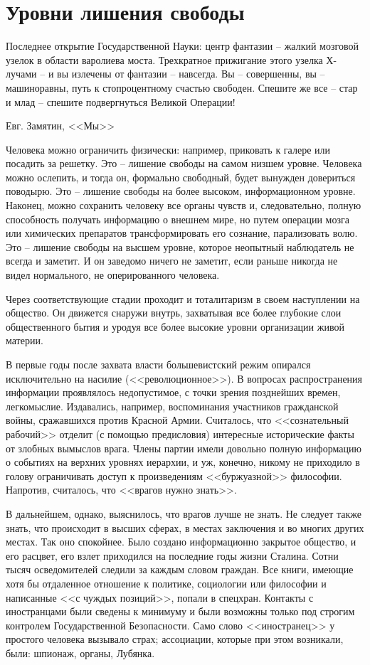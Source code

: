 \documentclass{book}
\begin{document}
\newpage
\section{Уровни лишения свободы}
\epigraph{Последнее открытие Государственной Науки: 
центр фантазии -- жалкий мозговой узелок в области варолиева моста. Трехкратное прижигание этого узелка Х-лучами -- и вы 
излечены от фантазии -- навсегда. 
Вы -- совершенны, вы -- машиноравны, путь к стопроцентному счастью свободен. Спешите же все -- стар и млад -- спешите 
подвергнуться Великой Операции!}{Евг. Замятин, <<Мы>>}

Человека можно ограничить физически: например, приковать к галере или посадить за решетку. Это -- лишение свободы на самом 
низшем уровне. Человека можно ослепить, и тогда он, формально свободный, будет вынужден довериться поводырю. Это -- лишение 
свободы на более высоком, информационном уровне. Наконец, можно сохранить человеку все органы чувств и, следовательно, полную 
способность получать информацию о внешнем мире, но путем операции мозга или химических препаратов трансформировать его сознание, 
парализовать волю. Это -- лишение свободы на высшем уровне, которое неопытный наблюдатель не всегда и заметит. И он заведомо 
ничего не заметит, если раньше никогда не видел нормального, не оперированного человека.

Через соответствующие стадии проходит и тоталитаризм в своем наступлении на общество. Он движется снаружи внутрь, захватывая все 
более глубокие слои общественного бытия и уродуя все более высокие уровни организации живой материи.

В первые годы после захвата власти большевистский ре­жим опирался исключительно на насилие (<<революционное>>). В вопросах распространения информации проявлялось недо­пустимое, с точки зрения позднейших времен, легкомыслие. Издавались, например, воспоминания участников гражданской войны, сражавшихся против Красной Армии. Считалось, что <<сознательный рабочий>> отделит (с помощью предисловия) интересные исторические факты от злобных вымыслов врага. Члены партии имели довольно полную информацию о событиях на верхних уровнях иерархии, и уж, конечно, никому не приходило в голову ограничивать доступ к произведениям <<буржуазной>> философии. Напротив, считалось, что <<врагов нужно знать>>.

В дальнейшем, однако, выяснилось, что врагов лучше не знать. Не следует также знать, что происходит в высших сферах, в местах заключения и во многих других местах. Так оно спокойнее. Было создано информационно закрытое общество, и его расцвет, его взлет приходился на последние годы жизни Сталина. Сотни тысяч осведомителей следили за каждым словом граждан. Все книги, имеющие хотя бы отдаленное отношение к политике, социологии или философии и написанные <<с чуждых позиций>>, попали в спецхран. Контакты с иностранцами были сведены к минимуму и были возможны только под строгим контролем Государственной Безопасности. Само слово <<иностранец>> у простого человека вызывало страх; ассоциации, которые при этом возникали, были: шпионаж, органы, Лубянка.
\end{document}
